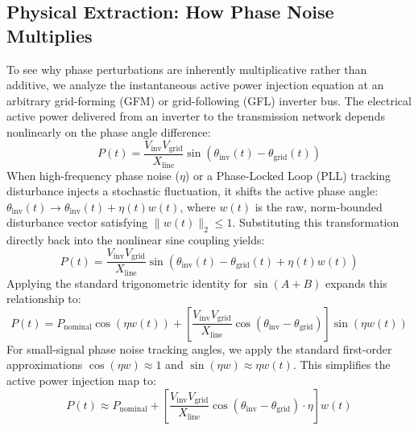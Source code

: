 \documentclass[10pt,journal,compsoc]{IEEEtran}
\begin{document}
\subsection{Physical Extraction: How Phase Noise Multiplies}
To see why phase perturbations are inherently multiplicative rather than additive, we analyze the instantaneous active power injection equation at an arbitrary grid-forming (GFM) or grid-following (GFL) inverter bus. The electrical active power delivered from an inverter to the transmission network depends nonlinearly on the phase angle difference:
\begin{equation}
    P(t) = \frac{V_{\text{inv}}V_{\text{grid}}}{X_{\text{line}}} \sin \left(\theta_{\text{inv}}(t) - \theta_{\text{grid}}(t)\right)
\end{equation}
When high-frequency phase noise ($\eta$) or a Phase-Locked Loop (PLL) tracking disturbance injects a stochastic fluctuation, it shifts the active phase angle: $\theta_{\text{inv}}(t) \rightarrow \theta_{\text{inv}}(t) + \eta(t) w(t)$, where $w(t)$ is the raw, norm-bounded disturbance vector satisfying $\|w(t)\|_2 \le 1$. Substituting this transformation directly back into the nonlinear sine coupling yields:
\begin{equation}
    P(t) = \frac{V_{\text{inv}}V_{\text{grid}}}{X_{\text{line}}} \sin \left(\theta_{\text{inv}}(t) - \theta_{\text{grid}}(t) + \eta(t)w(t)\right)
\end{equation}
Applying the standard trigonometric identity for $\sin(A + B)$ expands this relationship to:
\begin{equation}
    P(t) = P_{\text{nominal}}\cos(\eta w(t)) + \left[\frac{V_{\text{inv}}V_{\text{grid}}}{X_{\text{line}}}\cos\left(\theta_{\text{inv}} - \theta_{\text{grid}}\right)\right]\sin(\eta w(t))
\end{equation}
For small-signal phase noise tracking angles, we apply the standard first-order approximations $\cos(\eta w) \approx 1$ and \mbox{$\sin(\eta w) \approx \eta w(t)$}. This simplifies the active power injection map to:
\begin{equation}
    P(t) \approx P_{\text{nominal}} + \left[\frac{V_{\text{inv}}V_{\text{grid}}}{X_{\text{line}}}\cos \left(\theta_{\text{inv}} - \theta_{\text{grid}}\right) \cdot \eta \right]w(t)
\end{equation}
\end{document}
